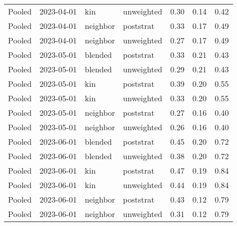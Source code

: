 \begin{table}[ht]
\begin{tabular}{llllrrr}
  Pooled & 2023-04-01 & kin & unweighted & 0.30 & 0.14 & 0.42 \\ 
  Pooled & 2023-04-01 & neighbor & poststrat & 0.33 & 0.17 & 0.49 \\ 
  Pooled & 2023-04-01 & neighbor & unweighted & 0.27 & 0.17 & 0.49 \\ 
  Pooled & 2023-05-01 & blended & poststrat & 0.33 & 0.21 & 0.43 \\ 
  Pooled & 2023-05-01 & blended & unweighted & 0.29 & 0.21 & 0.43 \\ 
  Pooled & 2023-05-01 & kin & poststrat & 0.39 & 0.20 & 0.55 \\ 
  Pooled & 2023-05-01 & kin & unweighted & 0.33 & 0.20 & 0.55 \\ 
  Pooled & 2023-05-01 & neighbor & poststrat & 0.27 & 0.16 & 0.40 \\ 
  Pooled & 2023-05-01 & neighbor & unweighted & 0.26 & 0.16 & 0.40 \\ 
  Pooled & 2023-06-01 & blended & poststrat & 0.45 & 0.20 & 0.72 \\ 
  Pooled & 2023-06-01 & blended & unweighted & 0.38 & 0.20 & 0.72 \\ 
  Pooled & 2023-06-01 & kin & poststrat & 0.47 & 0.19 & 0.84 \\ 
  Pooled & 2023-06-01 & kin & unweighted & 0.44 & 0.19 & 0.84 \\ 
  Pooled & 2023-06-01 & neighbor & poststrat & 0.43 & 0.12 & 0.79 \\ 
  Pooled & 2023-06-01 & neighbor & unweighted & 0.31 & 0.12 & 0.79 \\ 
  \end{tabular}
\caption{} 
\label{table:preregister_monthly}
\end{table}
